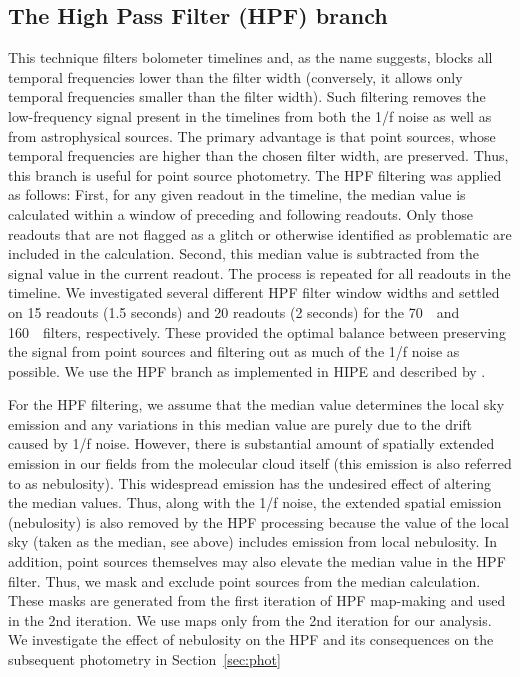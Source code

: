 \documentclass[manuscript]{aastex61}
\begin{document}
\subsection{The High Pass Filter (HPF) branch}
\par
This technique filters bolometer timelines and, as the name suggests, blocks all temporal frequencies lower than the filter width (conversely, it allows only temporal frequencies smaller than the filter width).  Such filtering removes the low-frequency signal present in the timelines from both the 1/f noise as well as from astrophysical sources.  The primary advantage is that point sources, whose temporal frequencies are higher than the chosen filter width, are preserved.  Thus, this branch is useful for point source photometry.  The HPF filtering was applied as follows:  First, for any given readout in the timeline, the median value is calculated within a window of preceding and following readouts.  Only those readouts that are not flagged as a glitch or otherwise identified as problematic are included in the calculation.  Second, this median value is subtracted from the signal value in the current readout.  The process is repeated for all readouts in the timeline.  We investigated several different HPF filter window widths and settled on 15 readouts (1.5 seconds) and 20 readouts (2 seconds) for the 70~\micron\ and 160~\micron\ filters, respectively.  These provided the optimal balance between preserving the signal from point sources and filtering out as much of the 1/f noise as possible.  We use the HPF branch as implemented in HIPE and described by \cite{hpf}.
\par
For the HPF filtering, we assume that the median value determines the local sky emission and any variations in this median value are purely due to the drift caused by 1/f noise.  However, there is substantial amount of spatially extended emission in our fields from the molecular cloud itself (this emission is also referred to as nebulosity).  This widespread emission has the undesired effect of altering the median values.  Thus, along with the 1/f noise, the extended spatial emission (nebulosity) is also removed by the HPF processing  because the value of the local sky (taken as the median, see above) includes emission from local nebulosity.  In addition, point sources themselves may also elevate the median value in the HPF filter.  Thus, we mask and exclude point sources from the median calculation.  These masks are generated from the first iteration of HPF map-making and used in the 2nd iteration.  We use maps only from the 2nd iteration for our analysis.  We investigate the effect of nebulosity on the HPF and its consequences on the subsequent photometry in Section~\ref{sec:phot}
\end{document}
